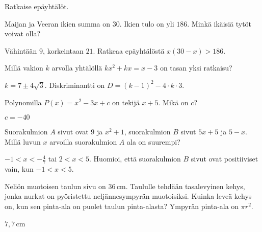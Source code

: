 \begin{tehtava} 
Ratkaise epäyhtälöt.
    \begin{vastaus}
    \end{vastaus}
\end{tehtava}

\begin{tehtava} 
Maijan ja Veeran ikien summa on $30$. Ikien tulo on yli $186$. Minkä ikäisiä tytöt voivat olla?
    \begin{vastaus}
	Vähintään $9$, korkeintaan $21$. Ratkeaa epäyhtälöstä $x(30-x)>186$.
	\end{vastaus}
\end{tehtava}

\begin{tehtava} 
Millä vakion $k$ arvolla yhtälöllä $kx^2+kx=x-3$ on tasan yksi ratkaisu?
    \begin{vastaus}
		$k = 7 \pm 4 \sqrt{3}$. Diskriminantti on $D = (k-1)^2-4\cdot k \cdot 3$.
    \end{vastaus}
\end{tehtava}

\begin{tehtava} 
Polynomilla $P(x)=x^2-3x+c$ on tekijä $x+5$. Mikä on $c$?
    \begin{vastaus}
		$c=-40$
    \end{vastaus}
\end{tehtava}

\begin{tehtava} 
Suorakulmion $A$ sivut ovat $9$ ja $x^2+1$, suorakulmion $B$ sivut $5x+5$
ja $5-x$. Millä luvun $x$ arvoilla suorakulmion $A$ ala on suurempi?
    \begin{vastaus}
	$-1 < x < -\frac{4}{7}$ tai $2 < x < 5$. Huomioi, että suorakulmion $B$
    sivut ovat positiiviset vain, kun $-1<x<5$.
    \end{vastaus}
\end{tehtava}

\begin{tehtava} %
Neliön muotoisen taulun sivu on $36$\,cm. Taululle tehdään tasalevyinen kehys, jonka nurkat on pyöristettu neljännesympyrän muotoisiksi. Kuinka leveä kehys on, kun sen pinta-ala on puolet taulun pinta-alasta? Ympyrän pinta-ala on $\pi r^2$.
    \begin{vastaus}
     $7,7$\,cm
    \end{vastaus}
\end{tehtava}

